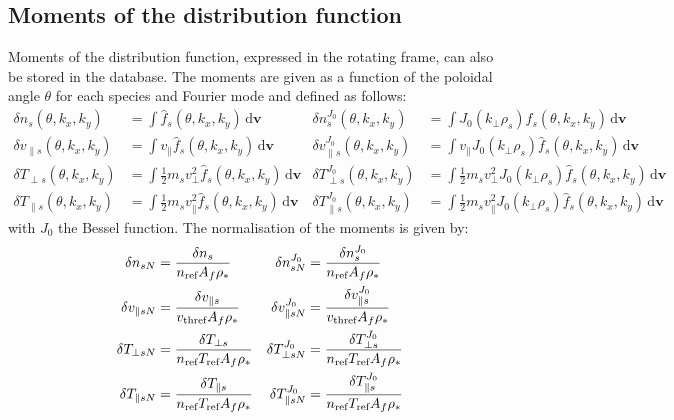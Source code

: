 \documentclass[fleqn]{report}
\begin{document}
\subsection{Moments of the distribution function}
Moments of the distribution function, expressed in the rotating frame, can also be stored in the database. The moments are given as a function of the poloidal angle $\theta$ for each species and Fourier mode and defined as follows:
\begin{align*}
\delta n_s(\theta,k_x,k_y) & =  \int \hat{f}_s(\theta,k_x,k_y) \,\textrm{d}\mathbf{v}& \delta n_s^{J_0}(\theta,k_x,k_y) & =  \int J_0(k_\perp\rho_s) \hat{f}_s(\theta,k_x,k_y) \,\textrm{d}\mathbf{v} \\
\delta v_{\parallel s}(\theta,k_x,k_y) & =  \int v_\parallel \hat{f}_s(\theta,k_x,k_y) \,\textrm{d}\mathbf{v}& \delta v_{\parallel s}^{J_0}(\theta,k_x,k_y) & =  \int v_\parallel J_0(k_\perp\rho_s) \hat{f}_s(\theta,k_x,k_y) \,\textrm{d}\mathbf{v}\\
\delta T_{\perp s}(\theta,k_x,k_y) & =  \int \frac{1}{2}m_s v_\perp^2 \hat{f}_s(\theta,k_x,k_y) \,\textrm{d}\mathbf{v}& \delta T_{\perp s}^{J_0}(\theta,k_x,k_y) & =  \int \frac{1}{2}m_s v_\perp^2 J_0(k_\perp\rho_s) \hat{f}_s(\theta,k_x,k_y) \,\textrm{d}\mathbf{v}\\
\delta T_{\parallel s}(\theta,k_x,k_y) & =  \int \frac{1}{2}m_s v_\parallel^2 \hat{f}_s(\theta,k_x,k_y) \,\textrm{d}\mathbf{v}& \delta T_{\parallel s}^{J_0}(\theta,k_x,k_y) & =  \int \frac{1}{2}m_s v_\parallel^2 J_0(k_\perp\rho_s) \hat{f}_s(\theta,k_x,k_y) \,\textrm{d}\mathbf{v}
\end{align*}
with $J_0$ the Bessel function. The normalisation of the moments is given by:
\begin{align*}
\delta n_{sN} & = \frac{\delta n_s}{n_{\textrm{ref}} A_f\rho_*}& \delta n_{sN}^{J_0} & = \frac{\delta n_s^{J_0}}{n_{\textrm{ref}} A_f\rho_*} \\
\delta v_{\parallel sN} & = \frac{\delta v_{\parallel s}}{v_\textrm{thref} A_f\rho_*}& \delta v_{\parallel sN}^{J_0} & = \frac{\delta v_{\parallel s}^{J_0}}{v_\textrm{thref} A_f\rho_*} \\
\delta T_{\perp sN} & = \frac{\delta T_{\perp s}}{n_{\textrm{ref}} T_{\textrm{ref}} A_f\rho_*}& \delta T_{\perp sN}^{J_0} & = \frac{\delta T_{\perp s}^{J_0}}{n_{\textrm{ref}} T_{\textrm{ref}} A_f\rho_*} \\
\delta T_{\parallel sN} & = \frac{\delta T_{\parallel s}}{n_{\textrm{ref}} T_{\textrm{ref}} A_f\rho_*}& \delta T_{\parallel sN}^{J_0} & = \frac{\delta T_{\parallel s}^{J_0}}{n_{\textrm{ref}} T_{\textrm{ref}} A_f\rho_*} 
\end{align*}
\end{document}

